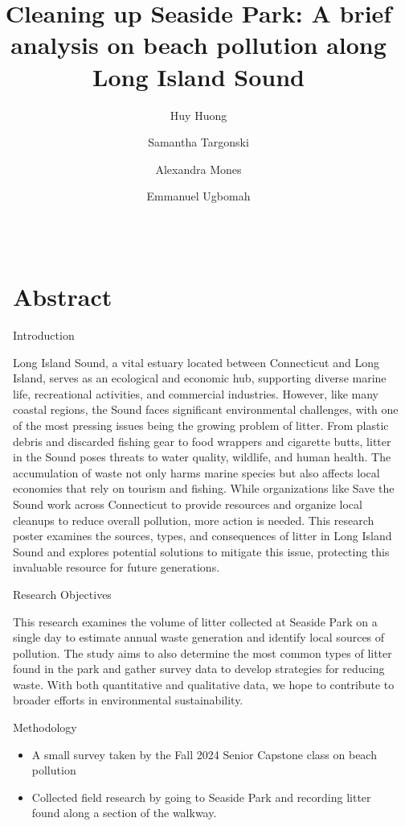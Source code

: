 \documentclass[final]{beamer}
\title{Cleaning up Seaside Park: A brief analysis on beach pollution along Long Island Sound}
\author{Huy Huong\inst{1} \and Samantha Targonski\inst{1} \and Alexandra Mones\inst{2} \and Emmanuel Ugbomah\inst{2}}
\institute[UB]{HONR-390/CAPS-390 Senior Capstone --- Island of Misfits}
\newlength{\sepwidth}
\newlength{\colwidth}
\newcommand{\separatorcolumn}{\begin{column}{\sepwidth}\end{column}}
\begin{document}
  \begin{frame}[t]
    \begin{columns}[t]
      \separatorcolumn

      \begin{column}{\colwidth}
        \section{Abstract}
        \begin{block}{Introduction}

          Long Island Sound, a vital estuary located between Connecticut and Long Island, serves as an ecological and economic hub, supporting diverse marine life, recreational activities, and commercial industries. However, like many coastal regions, the Sound faces significant environmental challenges, with one of the most pressing issues being the growing problem of litter. From plastic debris and discarded fishing gear to food wrappers and cigarette butts, litter in the Sound poses threats to water quality, wildlife, and human health. The accumulation of waste not only harms marine species but also affects local economies that rely on tourism and fishing. While organizations like Save the Sound \cite{STS_CT_Cleanup} work across Connecticut to provide resources and organize local cleanups to reduce overall pollution, more action is needed. This research poster examines the sources, types, and consequences of litter in Long Island Sound and explores potential solutions to mitigate this issue, protecting this invaluable resource for future generations.

        \end{block}

        \begin{block}{Research Objectives}

          This research examines the volume of litter collected at Seaside Park on a single day to estimate annual waste generation and identify local sources of pollution. The study aims to also determine the most common types of litter found in the park and gather survey data to develop strategies for reducing waste. With both quantitative and qualitative data, we hope to contribute to broader efforts in environmental sustainability.

        \end{block}

        \begin{block}{Methodology}
            \begin{itemize}
              \item A small survey taken by the Fall 2024 Senior Capstone class on beach pollution
              \item Collected field research by going to Seaside Park and recording litter found along a section of the walkway.
            \end{itemize}


\end{block}
\end{column}
\end{columns}
\end{frame}
\end{document}
